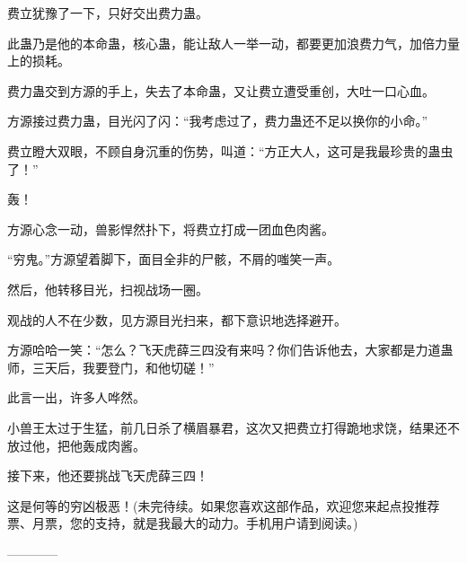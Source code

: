 \begin{this_body}
费立犹豫了一下，只好交出费力蛊。

此蛊乃是他的本命蛊，核心蛊，能让敌人一举一动，都要更加浪费力气，加倍力量上的损耗。

费力蛊交到方源的手上，失去了本命蛊，又让费立遭受重创，大吐一口心血。

方源接过费力蛊，目光闪了闪：“我考虑过了，费力蛊还不足以换你的小命。”

费立瞪大双眼，不顾自身沉重的伤势，叫道：“方正大人，这可是我最珍贵的蛊虫了！”

轰！

方源心念一动，兽影悍然扑下，将费立打成一团血色肉酱。

“穷鬼。”方源望着脚下，面目全非的尸骸，不屑的嗤笑一声。

然后，他转移目光，扫视战场一圈。

观战的人不在少数，见方源目光扫来，都下意识地选择避开。

方源哈哈一笑：“怎么？飞天虎薛三四没有来吗？你们告诉他去，大家都是力道蛊师，三天后，我要登门，和他切磋！”

此言一出，许多人哗然。

小兽王太过于生猛，前几日杀了横眉暴君，这次又把费立打得跪地求饶，结果还不放过他，把他轰成肉酱。

接下来，他还要挑战飞天虎薛三四！

这是何等的穷凶极恶！(未完待续。如果您喜欢这部作品，欢迎您来起点投推荐票、月票，您的支持，就是我最大的动力。手机用户请到阅读。)

------------

\end{this_body}


